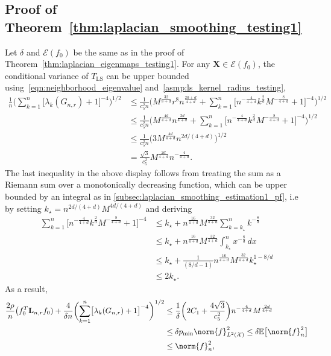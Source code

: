 \documentclass{article}
\newcommand{\1}{\mathbf{1}}
\newcommand{\Lap}{{\bf L}}
\newcommand{\Xset}{\mathcal{X}}
\newcommand{\Leb}{L}
\newcommand{\mc}[1]{\mathcal{#1}}
\newcommand{\Ebb}{\mathbb{E}}
\newcommand{\LS}{\mathrm{LS}}
\theoremstyle{alden}
\theoremstyle{aldenthm}
\theoremstyle{definition}
\theoremstyle{remark}
\begin{document}
\subsection{Proof of Theorem~\ref{thm:laplacian_smoothing_testing1}}
Let $\delta$ and $\mc{E}(f_0)$ be the same as in the proof of Theorem~\ref{thm:laplacian_eigenmaps_testing1}. For any $\mathbf{X} \in \mc{E}(f_0)$, the conditional variance of $T_{\LS}$ can be upper bounded using~\eqref{eqn:neighborhood_eigenvalue} and~\ref{asmp:ls_kernel_radius_testing},
\begin{align*}
\frac{1}{n} \biggl(\sum_{k = 1}^{n} \bigl[\lambda_k(G_{n,r}) + 1\bigr]^{-4}\biggr)^{1/2} & \leq \frac{1}{c_5^2 n} \biggl(M^{\frac{32}{8 + d}}r^8n^{\frac{20+d}{4+d}} + \sum_{k = 1}^{n} \bigl[n^{-\frac{4}{4 + d}}k^{\frac{2}{d}}M^{-\frac{8}{4 + d}} + 1\bigr]^{-4}\biggr)^{1/2} \\
& \leq \frac{1}{c_5^2 n} \biggl(M^{\frac{4d}{4 + d}}n^{\frac{2d}{4 + d}} + \sum_{k = 1}^{n} \bigl[n^{-\frac{4}{4 + d}}k^{\frac{2}{d}}M^{-\frac{8}{4 + d}} + 1\bigr]^{-4}\biggr)^{1/2} \\
& \leq \frac{1}{c_5^2 n} \biggl(3 M^{\frac{4d}{4 + d}}n^{2d/(4 + d)}\biggr)^{1/2} \\
& = \frac{\sqrt{3}}{c_5^2} M^{\frac{2d}{4 + d}} n^{-\frac{4}{4 + d}}.
\end{align*}
The last inequality in the above display follows from treating the sum as a Riemann sum over a monotonically decreasing function, which can be upper bounded by an integral as in \ref{subsec:laplacian_smoothing_estimation1_pf}, i.e by setting $k_{\star} = n^{2d/(4+d)}M^{4d/(4 + d)}$ and deriving
\begin{equation}
\begin{aligned}
\label{pf:laplacian_smooting_testing1}
\sum_{k = 1}^{n} \bigl[n^{-\frac{4}{4 + d}}k^{\frac{2}{d}}M^{-\frac{8}{4 + d}} + 1\bigr]^{-4} & \leq k_{\star} + n^{\frac{16}{4 + d}} M^{\frac{32}{4 + d}}\sum_{k = k_{\star}}^{n} k^{-\frac{8}{d}}\\
& \leq k_{\star} + n^{\frac{16}{4 + d}} M^{\frac{32}{4 + d}} \int_{k_{\star}}^{n} x^{-\frac{8}{d}} \,dx \\
& \leq  k_{\star} + \frac{1}{(8/d - 1)}n^{\frac{16}{4 + d}} M^{\frac{32}{4 + d}} k_{\star}^{1 - 8/d} \\
& \leq 2k_{\star}.
\end{aligned}
\end{equation}
As a result, 
\begin{align*}
\frac{2\rho}{n} \bigl(f_0^T \Lap_{n,r} f_0) + \frac{4}{\delta n}\biggl(\sum_{k = 1}^{n} \bigl[\lambda_k(G_{n,r}) + 1\bigr]^{-4}\biggr)^{1/2} & \leq \frac{1}{\delta}\biggl(2C_1 + \frac{4\sqrt{3}}{c_5^2}\biggr)n^{-\frac{4}{4 + d}} M^{\frac{2d}{4 + d}} \\
& \leq \delta p_{\min} \norm{f}_{\Leb^2(\Xset)}^2 \leq \delta \Ebb\bigl[\norm{f}_n^2\bigr] \\
& \leq \norm{f}_n^2,
\end{align*}
\end{document}
